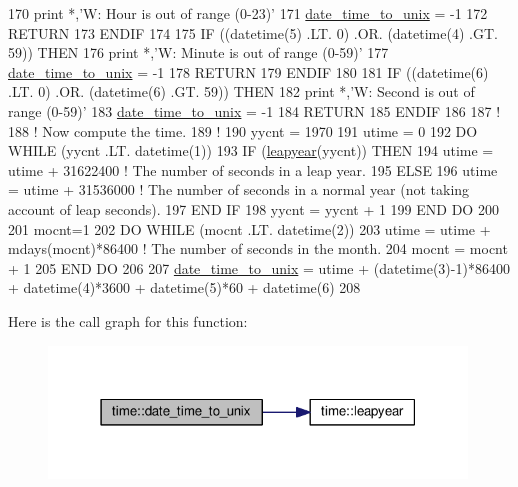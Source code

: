 \begin{DoxyCode}
170     print *,\textcolor{stringliteral}{'W: Hour is out of range (0-23)'}
171     \hyperlink{namespacetime_a7c66adfc707644b0644b33e1557f1486}{date\_time\_to\_unix}   = -1
172     \textcolor{keywordflow}{RETURN}
173 \textcolor{keywordflow}{ENDIF}
174 
175 \textcolor{keywordflow}{IF} ((datetime(5) .LT. 0) .OR. (datetime(4) .GT. 59)) \textcolor{keywordflow}{THEN}
176     print *,\textcolor{stringliteral}{'W: Minute is out of range (0-59)'}
177     \hyperlink{namespacetime_a7c66adfc707644b0644b33e1557f1486}{date\_time\_to\_unix}   = -1
178     \textcolor{keywordflow}{RETURN}
179 \textcolor{keywordflow}{ENDIF}
180 
181 \textcolor{keywordflow}{IF} ((datetime(6) .LT. 0) .OR. (datetime(6) .GT. 59)) \textcolor{keywordflow}{THEN}
182     print *,\textcolor{stringliteral}{'W: Second is out of range (0-59)'}
183     \hyperlink{namespacetime_a7c66adfc707644b0644b33e1557f1486}{date\_time\_to\_unix}   = -1
184     \textcolor{keywordflow}{RETURN}
185 \textcolor{keywordflow}{ENDIF}
186 
187 \textcolor{comment}{!}
188 \textcolor{comment}{! Now compute the time.}
189 \textcolor{comment}{!}
190 yycnt   = 1970
191 utime   = 0
192 \textcolor{keywordflow}{DO} \textcolor{keywordflow}{WHILE} (yycnt .LT. datetime(1))
193     \textcolor{keywordflow}{IF} (\hyperlink{namespacetime_ac7f82d40fd2b49e7e9025b103e88555c}{leapyear}(yycnt)) \textcolor{keywordflow}{THEN}
194         utime   = utime + 31622400  \textcolor{comment}{! The number of seconds in a leap year.}
195     \textcolor{keywordflow}{ELSE}
196         utime   = utime + 31536000  \textcolor{comment}{! The number of seconds in a normal year (not taking account of leap
       seconds).}
197 \textcolor{keywordflow}{    END IF}
198     yycnt   = yycnt + 1
199 \textcolor{keywordflow}{END DO}
200 
201 mocnt=1
202 \textcolor{keywordflow}{DO} \textcolor{keywordflow}{WHILE} (mocnt .LT. datetime(2))
203     utime   = utime + mdays(mocnt)*86400    \textcolor{comment}{! The number of seconds in the month.}
204     mocnt   = mocnt + 1
205 \textcolor{keywordflow}{END DO}
206 
207 \hyperlink{namespacetime_a7c66adfc707644b0644b33e1557f1486}{date\_time\_to\_unix}   = utime + (datetime(3)-1)*86400 + datetime(4)*3600 + datetime(5)*60 + 
      datetime(6)
208 
\end{DoxyCode}


Here is the call graph for this function\+:\nopagebreak
\begin{figure}[H]
\begin{center}
\leavevmode
\includegraphics[width=315pt]{namespacetime_a7c66adfc707644b0644b33e1557f1486_cgraph}
\end{center}
\end{figure}



